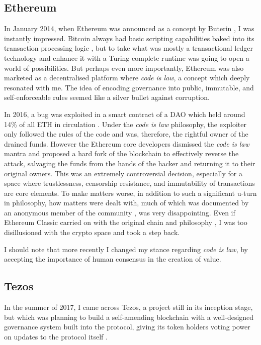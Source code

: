 \subsection*{Ethereum}

In January 2014, when Ethereum was announced as a concept by Buterin \citeyear{buterinEthereumNextGenerationCryptocurrency2014}, I was instantly impressed. Bitcoin always had basic scripting capabilities baked into its transaction processing logic \cite{ScriptBitcoinWiki2024}, but to take what was mostly a transactional ledger technology and enhance it with a Turing-complete runtime was going to open a world of possibilities. But perhaps even more importantly, Ethereum was also marketed as a decentralised platform where \emph{\gls{code is law}}, a concept which deeply resonated with me. The idea of encoding governance into public, immutable, and self-enforceable rules seemed like a silver bullet against corruption.

In 2016, a bug was exploited in a smart contract of a DAO which held around 14\% of all ETH in circulation \cite{morrisCoinDeskTurns102023}. Under the \emph{code is law} philosophy, the exploiter only followed the rules of the code and was, therefore, the rightful owner of the drained funds. However the Ethereum core developers dismissed the \emph{code is law} mantra and proposed a hard fork of the blockchain \cite{buterinCRITICALUPDATERe2016} to effectively reverse the attack, salvaging the funds from the hands of the hacker and returning it to their original owners. This was an extremely controversial decision, especially for a space where trustlessness, censorship resistance, and immutability of transactions are core elements. To make matters worse, in addition to such a significant u-turn in philosophy, how matters were dealt with, much of which was documented by an anonymous member of the community \cite{yourstruly1DAOHistoryIt2018}, was very disappointing. Even if Ethereum Classic carried on with the original chain and philosophy \cite{CodeLaw2022}, I was too disillusioned with the crypto space and took a step back.

I should note that more recently I changed my stance regarding \emph{code is law}, by accepting the importance of human consensus in the creation of value.


\subsection*{Tezos}

In the summer of 2017, I came across Tezos, a project still in its inception stage, but which was planning to build a self-amending blockchain with a well-designed governance system built into the protocol, giving its token holders voting power on updates to the protocol itself \cite{goodmanTezosSelfamendingCryptoledger2014a}. 


